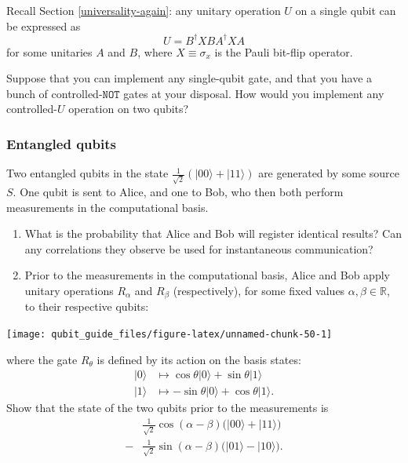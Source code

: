 \documentclass[fleqn,a4paper]{article}
\theoremstyle{definition}
\theoremstyle{definition}
\theoremstyle{definition}
\theoremstyle{definition}
\theoremstyle{remark}
\begin{document}
Recall Section \ref{universality-again}: any unitary operation \(U\) on a single qubit can be expressed as
\[
  U = B^\dagger XBA^\dagger XA
\]
for some unitaries \(A\) and \(B\), where \(X\equiv\sigma_x\) is the Pauli bit-flip operator.

Suppose that you can implement any single-qubit gate, and that you have a bunch of controlled-\(\texttt{NOT}\) gates at your disposal.
How would you implement any controlled-\(U\) operation on two qubits?

\hypertarget{entangled-qubits}{%
\subsubsection{Entangled qubits}\label{entangled-qubits}}

Two entangled qubits in the state \(\frac{1}{\sqrt{2}}(|00\rangle+|11\rangle)\) are generated by some source \(S\).
One qubit is sent to Alice, and one to Bob, who then both perform measurements in the computational basis.

\begin{enumerate}
\def\labelenumi{\arabic{enumi}.}
\item
  What is the probability that Alice and Bob will register identical results?
  Can any correlations they observe be used for instantaneous communication?
\item
  Prior to the measurements in the computational basis, Alice and Bob apply unitary operations \(R_\alpha\) and \(R_\beta\) (respectively), for some fixed values \(\alpha,\beta\in\mathbb{R}\), to their respective qubits:
\end{enumerate}

\begin{center}\texttt{[image: qubit\_guide\_files/figure-latex/unnamed-chunk-50-1]} \end{center}

where the gate \(R_\theta\) is defined by its action on the basis states:
\[
    \begin{aligned}
      |0\rangle
      &\longmapsto
      \cos\theta|0\rangle + \sin\theta|1\rangle
    \\|1\rangle
      &\longmapsto
      -\sin\theta|0\rangle + \cos\theta|1\rangle.
    \end{aligned}
  \]
Show that the state of the two qubits prior to the measurements is
\[
    \begin{aligned}
      &\frac{1}{\sqrt{2}}\cos(\alpha-\beta)\big( |00\rangle + |11\rangle \big)
    \\- &\frac{1}{\sqrt{2}}\sin(\alpha-\beta)\big( |01\rangle - |10\rangle \big).
    \end{aligned}
  \]
\end{document}
